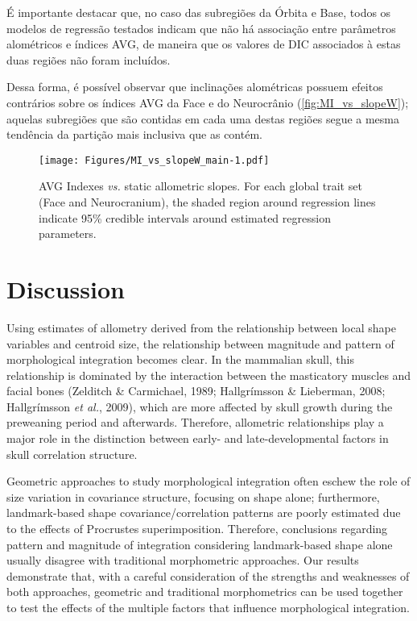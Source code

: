 \documentclass[12pt,]{article}
\begin{document}
É importante destacar que, no caso das subregiões da Órbita e Base,
todos os modelos de regressão testados indicam que não há associação
entre parâmetros alométricos e índices AVG, de maneira que os valores de
DIC associados à estas duas regiões não foram incluídos.

Dessa forma, é possível observar que inclinações alométricas possuem
efeitos contrários sobre os índices AVG da Face e do Neurocrânio
(\autoref{fig:MI_vs_slopeW}); aquelas subregiões que são contidas em
cada uma destas regiões segue a mesma tendência da partição mais
inclusiva que as contém.

\begin{figure}[htbp]
\centering
\texttt{[image: Figures/MI\_vs\_slopeW\_main-1.pdf]}
\caption{AVG Indexes \emph{vs.} static allometric slopes. For each
global trait set (Face and Neurocranium), the shaded region around
regression lines indicate 95\% credible intervals around estimated
regression parameters. \label{fig:MI_vs_slopeW_main}}
\end{figure}

\section{Discussion}\label{discussion}

Using estimates of allometry derived from the relationship between local
shape variables and centroid size, the relationship between magnitude
and pattern of morphological integration becomes clear. In the mammalian
skull, this relationship is dominated by the interaction between the
masticatory muscles and facial bones (Zelditch \& Carmichael, 1989;
Hallgrímsson \& Lieberman, 2008; Hallgrímsson \emph{et al.}, 2009),
which are more affected by skull growth during the preweaning period and
afterwards. Therefore, allometric relationships play a major role in the
distinction between early- and late-developmental factors in skull
correlation structure.

Geometric approaches to study morphological integration often eschew the
role of size variation in covariance structure, focusing on shape alone;
furthermore, landmark-based shape covariance/correlation patterns are
poorly estimated due to the effects of Procrustes superimposition.
Therefore, conclusions regarding pattern and magnitude of integration
considering landmark-based shape alone usually disagree with traditional
morphometric approaches. Our results demonstrate that, with a careful
consideration of the strengths and weaknesses of both approaches,
geometric and traditional morphometrics can be used together to test the
effects of the multiple factors that influence morphological
integration.
\end{document}
